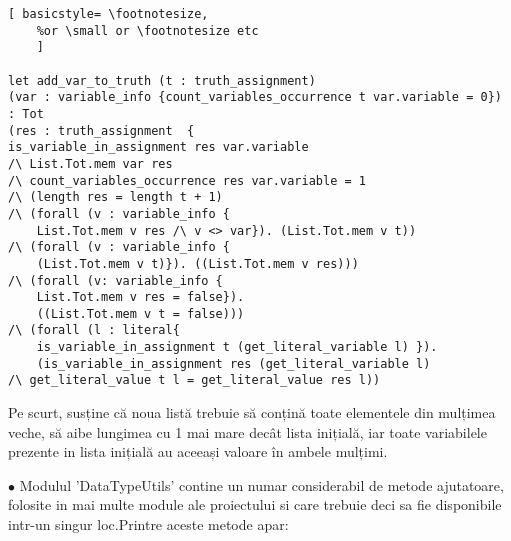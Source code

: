 \begin{lstlisting}[	basicstyle= \footnotesize, 
	%or \small or \footnotesize etc
	]

let add_var_to_truth (t : truth_assignment) 
(var : variable_info {count_variables_occurrence t var.variable = 0}) 
: Tot 
(res : truth_assignment  {
is_variable_in_assignment res var.variable
/\ List.Tot.mem var res
/\ count_variables_occurrence res var.variable = 1
/\ (length res = length t + 1) 
/\ (forall (v : variable_info {
	List.Tot.mem v res /\ v <> var}). (List.Tot.mem v t))
/\ (forall (v : variable_info {
	(List.Tot.mem v t)}). ((List.Tot.mem v res)))
/\ (forall (v: variable_info {
	List.Tot.mem v res = false}). 
	((List.Tot.mem v t = false)))
/\ (forall (l : literal{ 
	is_variable_in_assignment t (get_literal_variable l) }). 
	(is_variable_in_assignment res (get_literal_variable l)
/\ get_literal_value t l = get_literal_value res l))  

\end{lstlisting}

 Pe scurt, susține că noua listă trebuie să conțină toate elementele din mulțimea veche, să aibe lungimea cu 1 mai mare decât lista inițială, iar toate variabilele prezente in lista inițială au aceeași valoare în ambele mulțimi.

$\bullet$ Modulul 'DataTypeUtils' contine un numar considerabil de metode ajutatoare, folosite in mai multe module ale proiectului si care trebuie deci sa fie disponibile intr-un singur loc.\newpage Printre aceste metode apar:



